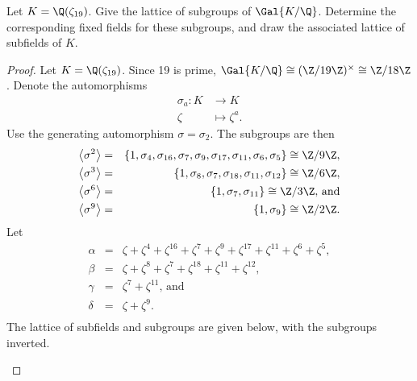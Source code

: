 \documentclass[10pt]{amsart}
\begin{document}
\begin{thm}
  Let $K = \Q(\zeta_{19})$.
  Give the lattice of subgroups of $\Gal{K/\Q}$.
  Determine the corresponding fixed fields for these subgroups, and draw the associated lattice of subfields of $K$.
  
  \begin{proof}
    Let $K = \Q(\zeta_{19})$.
    Since 19 is prime, $\Gal{K/\Q} \cong (\Z/19\Z)^\times \cong \Z/18\Z$.
    Denote the automorphisms 
    \begin{align*}
      \sigma_a \colon K &\rightarrow K\\
      \zeta &\mapsto \zeta^a.
    \end{align*}
    Use the generating automorphism $\sigma = \sigma_2$.
    The subgroups are then 
    \begin{eqnarray*}
      \left<\sigma^2\right> &=& \left\{1, \sigma_4, \sigma_{16}, \sigma_7, \sigma_9, \sigma_{17}, \sigma_{11}, \sigma_6, \sigma_5\right\} \cong \Z/9\Z,\\
      \left<\sigma^3\right> &=& \left\{1, \sigma_8, \sigma_7, \sigma_{18}, \sigma_{11}, \sigma_{12} \right\} \cong \Z/6\Z,\\
      \left<\sigma^6\right> &=& \left\{1, \sigma_7, \sigma_{11}\right\} \cong \Z/3\Z,\, \text{and}\\
      \left<\sigma^9\right> &=& \left\{1, \sigma_9\right\} \cong \Z/2\Z.
    \end{eqnarray*}
    Let 
    \begin{eqnarray*}
      \alpha &=& \zeta + \zeta^4 + \zeta^{16}+ \zeta^7+ \zeta^9+ \zeta^{17}+ \zeta^{11}+ \zeta^6+ \zeta^5,\\
      \beta &=& \zeta + \zeta^8+ \zeta^7+ \zeta^{18}+ \zeta^{11}+ \zeta^{12},\\
      \gamma &=& \zeta^7+ \zeta^{11},\, \text{and}\\
      \delta &=& \zeta + \zeta^9.\\
    \end{eqnarray*}
    The lattice of subfields and subgroups are given below, with the subgroups inverted.
      \begin{center}
\end{center}
\end{proof}
\end{thm}
\end{document}
